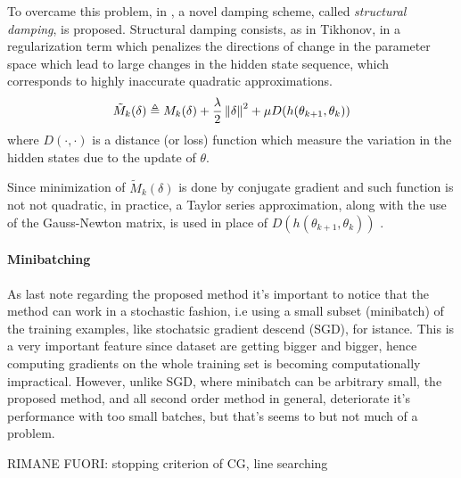 To overcame this problem, in \cite{hessianFree}, a novel damping scheme, called \textit{structural damping}, is proposed.
Structural damping consists, as in Tikhonov, in a regularization term which  penalizes the directions of change in the parameter space which lead to large changes in the hidden state sequence, which corresponds to highly inaccurate quadratic approximations.
\begin{equation}
 \tilde{M}_k(\delta) \triangleq  M_k(\delta) + \frac{\lambda}{2} \left\Vert \delta \right\Vert^2 + \mu D(h(\theta_{k+1}, \theta_{k}))
\end{equation}
where $D(\cdot,\cdot)$ is a distance (or loss) function which measure the variation in the hidden states due to the update of $\theta$.

Since minimization of $\tilde{M}_k(\delta)$ is done by conjugate gradient and such function is not not quadratic, in practice, a Taylor series approximation, along with the use of the Gauss-Newton matrix, is used in place of $D(h(\theta_{k+1}, \theta_{k}))$ .

\paragraph{Minibatching}
As last note regarding the proposed method it's important to notice that the method can work in a stochastic fashion, i.e using a small subset (minibatch) of the training examples, like stochatsic gradient descend (SGD), for istance. This is a very important feature since dataset are getting bigger and bigger, hence computing gradients on the whole training set is becoming computationally impractical. However, unlike SGD, where minibatch can be arbitrary small, the proposed method, and all second order method in general, deteriorate it's performance with too small batches, but that's seems to but not much of a problem.

RIMANE FUORI: stopping criterion of CG, line searching


